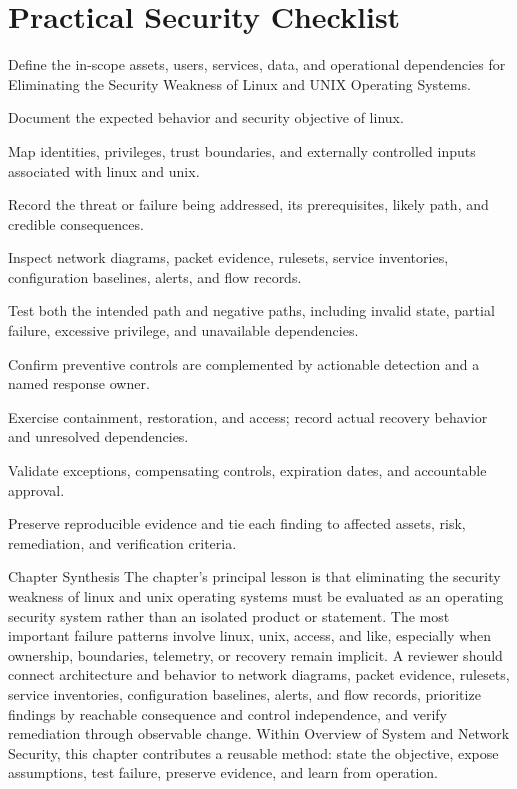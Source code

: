 \documentclass[11pt,letterpaper]{article}
\begin{document}
\section*{Practical Security Checklist}
\begin{CornellChecklist}
\item Define the in-scope assets, users, services, data, and operational dependencies for Eliminating the Security Weakness of Linux and UNIX Operating Systems.
\item Document the expected behavior and security objective of linux.
\item Map identities, privileges, trust boundaries, and externally controlled inputs associated with linux and unix.
\item Record the threat or failure being addressed, its prerequisites, likely path, and credible consequences.
\item Inspect network diagrams, packet evidence, rulesets, service inventories, configuration baselines, alerts, and flow records.
\item Test both the intended path and negative paths, including invalid state, partial failure, excessive privilege, and unavailable dependencies.
\item Confirm preventive controls are complemented by actionable detection and a named response owner.
\item Exercise containment, restoration, and access; record actual recovery behavior and unresolved dependencies.
\item Validate exceptions, compensating controls, expiration dates, and accountable approval.
\item Preserve reproducible evidence and tie each finding to affected assets, risk, remediation, and verification criteria.
\end{CornellChecklist}
\begin{CornellSummaryBox}{Chapter Synthesis}
The chapter's principal lesson is that eliminating the security weakness of linux and unix operating systems must be evaluated as an operating security system rather than an isolated product or statement. The most important failure patterns involve linux, unix, access, and like, especially when ownership, boundaries, telemetry, or recovery remain implicit. A reviewer should connect architecture and behavior to network diagrams, packet evidence, rulesets, service inventories, configuration baselines, alerts, and flow records, prioritize findings by reachable consequence and control independence, and verify remediation through observable change. Within Overview of System and Network Security, this chapter contributes a reusable method: state the objective, expose assumptions, test failure, preserve evidence, and learn from operation.
\end{CornellSummaryBox}
\end{document}
